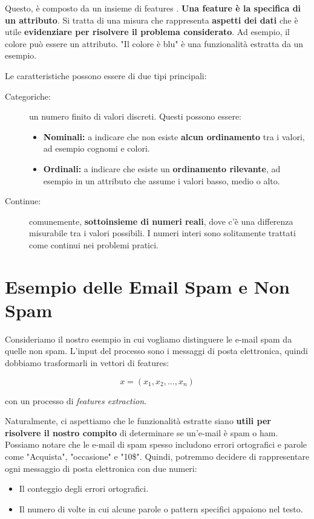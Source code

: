 \noindent
Questo, è composto da un insieme di features . \textbf{Una feature è la specifica di un attributo}.
Si tratta di una misura che rappresenta \textbf{aspetti dei dati }che è utile \textbf{evidenziare per risolvere il problema considerato}. Ad esempio, il colore può essere un attributo. "Il colore è blu" è una funzionalità estratta da un esempio.

\noindent
Le caratteristiche possono essere di due tipi principali:

\begin{description}
    \item[Categoriche:] un numero finito di valori discreti. Questi possono essere:
    \begin{itemize}
        \item \textbf{Nominali:} a indicare che non esiste \textbf{alcun ordinamento} tra i valori, ad esempio cognomi e colori.
        \item \textbf{Ordinali:} a indicare che esiste un \textbf{ordinamento rilevante}, ad esempio in un attributo che assume i valori basso, medio o alto.
    \end{itemize}
    \item[Continue:] comunemente, \textbf{sottoinsieme di numeri reali}, dove c'è una differenza misurabile tra i valori possibili. I numeri interi sono solitamente trattati come continui nei problemi pratici.
\end{description}

\section{Esempio delle Email Spam e Non Spam}

Consideriamo il nostro esempio in cui vogliamo distinguere le e-mail spam da quelle non spam.
L'input del processo sono i messaggi di posta elettronica, quindi dobbiamo trasformarli in vettori di features:

$$ x = (x_1, x_2, ..., x_n)$$

\noindent
con un processo di \emph{features extraction}.

Naturalmente, ci aspettiamo che le funzionalità estratte siano\textbf{ utili per risolvere il nostro compito} di determinare se un'e-mail è spam o ham. Possiamo notare che le e-mail di spam spesso includono errori ortografici e parole come "Acquista", "occasione" e "10\$". Quindi, potremmo decidere di rappresentare ogni messaggio di posta elettronica con due numeri:

\begin{itemize}
    \item Il conteggio degli errori ortografici.
    \item Il numero di volte in cui alcune parole o pattern specifici appaiono nel testo.
\end{itemize}

